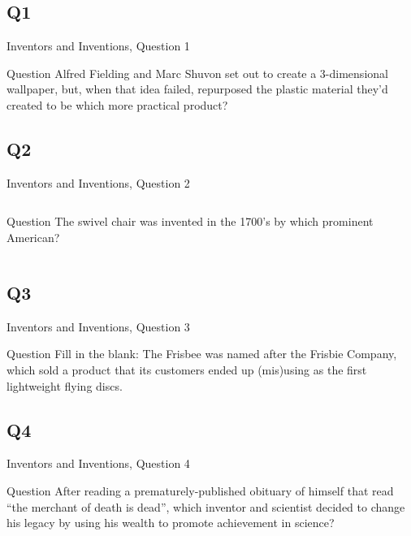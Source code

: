 \documentclass[11pt]{beamer}
\begin{document}
\subsection*{Q1}
\begin{frame}[t]{Inventors and Inventions, Question 1}
\begin{block}{Question}
Alfred Fielding and Marc Shuvon set out to create a 3-dimensional wallpaper, but, when that idea failed, repurposed the plastic material they'd created to be which more practical product?
\end{block}
\end{frame}
\subsection*{Q2}
\begin{frame}[t]{Inventors and Inventions, Question 2}
\begin{columns}[T,totalwidth=\linewidth]
\begin{column}{0.32\linewidth}
\begin{block}{Question}
The swivel chair was invented in the 1700's by which prominent American?
\end{block}
\end{column}
\begin{column}{0.65\linewidth}
\begin{center}
\texttt{[image: \{Images/swivel]}.jpg}
\end{center}
\end{column}
\end{columns}
\end{frame}
\subsection*{Q3}
\begin{frame}[t]{Inventors and Inventions, Question 3}
\begin{block}{Question}
Fill in the blank: The Frisbee was named after the Frisbie \textunderscore{}\textunderscore{}\textunderscore{}\textunderscore{}\textunderscore{} Company, which sold a product that its customers ended up (mis)using as the first lightweight flying discs.
\end{block}
\end{frame}
\subsection*{Q4}
\begin{frame}[t]{Inventors and Inventions, Question 4}
\begin{block}{Question}
After reading a prematurely-published obituary of himself that read ``the merchant of death is dead'', which inventor and scientist decided to change his legacy by using his wealth to promote achievement in science?
\end{block}
\end{frame}
\end{document}
